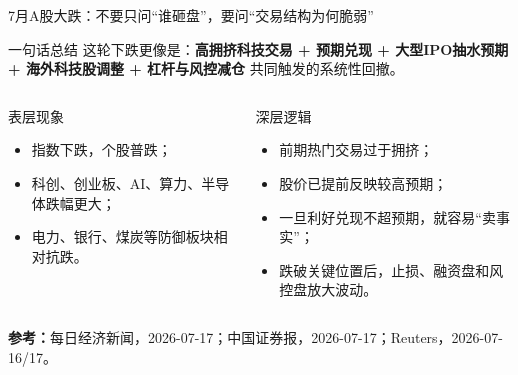 \documentclass[UTF8,aspectratio=169,11pt]{ctexbeamer}
\newcommand{\source}[1]{\vfill{\scriptsize\color{aqgray}\textbf{参考：}#1}}
\begin{document}
\begin{frame}{7月A股大跌：不要只问“谁砸盘”，要问“交易结构为何脆弱”}
\small
\begin{keybox}{一句话总结}
这轮下跌更像是：\textbf{高拥挤科技交易 + 预期兑现 + 大型IPO抽水预期 + 海外科技股调整 + 杠杆与风控减仓} 共同触发的系统性回撤。
\end{keybox}

\vspace{0.2cm}
\begin{columns}[T,totalwidth=\textwidth]
\begin{casebox}{表层现象}
\begin{itemize}
\item 指数下跌，个股普跌；
\item 科创、创业板、AI、算力、半导体跌幅更大；
\item 电力、银行、煤炭等防御板块相对抗跌。
\end{itemize}
\end{casebox}

\begin{riskbox}{深层逻辑}
\begin{itemize}
\item 前期热门交易过于拥挤；
\item 股价已提前反映较高预期；
\item 一旦利好兑现不超预期，就容易“卖事实”；
\item 跌破关键位置后，止损、融资盘和风控盘放大波动。
\end{itemize}
\end{riskbox}
\end{columns}

\source{每日经济新闻，2026-07-17；中国证券报，2026-07-17；Reuters，2026-07-16/17。}
\end{frame}
\end{document}
